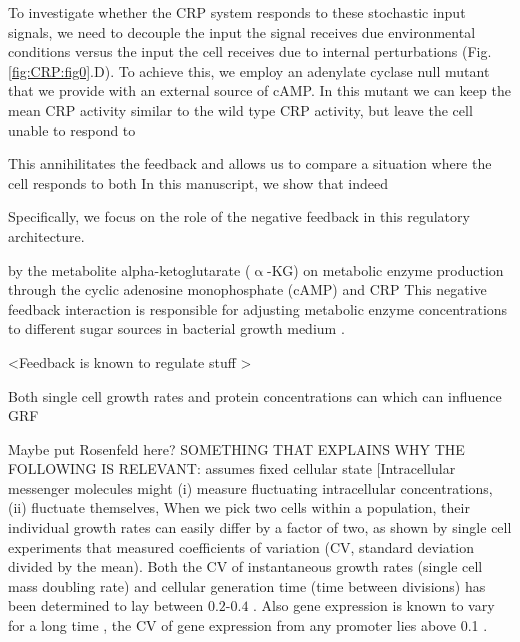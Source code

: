 To investigate whether the CRP system responds to these stochastic input signals, 
%
we need to decouple the input the signal receives due environmental conditions versus the input the cell receives due to internal perturbations (Fig. \ref{fig:CRP:fig0}.D).
%
To achieve this,
we employ an adenylate cyclase null mutant that we provide with an external source of cAMP.
%
In this mutant we can keep the mean CRP activity similar to the wild type CRP activity, 
but leave the cell unable to respond to 


This annihilitates the feedback and allows us to compare a situation where the cell responds to both 
%
In this manuscript, we show that indeed 




Specifically, we focus on the role of the negative feedback in this regulatory architecture.


by the metabolite alpha-ketoglutarate ($\upalpha$-KG) on metabolic enzyme production through the cyclic adenosine monophosphate (cAMP) and CRP 
This negative feedback interaction is responsible for adjusting metabolic enzyme concentrations to different sugar sources in bacterial growth medium \cite{Towbin2017, Doucette2011, You2013}.







<Feedback is known to regulate stuff \cite{Goyal2010}>

Both single cell growth rates and protein concentrations can 
which can influence GRF

Maybe put Rosenfeld here?
SOMETHING THAT EXPLAINS WHY THE FOLLOWING IS RELEVANT:
assumes fixed cellular state
[Intracellular messenger molecules might (i) measure fluctuating intracellular concentrations, (ii) fluctuate themselves, 
%
When we pick two cells within a population, their individual growth rates can easily differ by a factor of two, 
as shown by single cell experiments that measured coefficients of variation (CV, standard deviation divided by the mean).
%
Both the CV of instantaneous growth rates (single cell mass doubling rate) and cellular generation time (time between divisions) has been determined to lay between $0.2$-$0.4$ \cite{Kiviet2014, Hashimoto2016}.
%
Also gene expression is known to vary for a long time \cite{Elowitz2002}, 
the CV of gene expression from any promoter lies above 0.1 \cite{Keren2015}.



